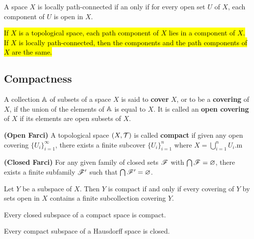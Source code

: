 \vs

\begin{thm}
A space $X$ is locally path-connected if an only if for every open set $U$ of $X$, each component of $U$ is open in $X$.
\end{thm}

\vs

\begin{thm}
\hl{If $X$ is a topological space, each path component of $X$ lies in a component of $X$. If $X$ is locally path-connected, then the components and the path components of $X$ are the same.}
\end{thm}


\subsection{Compactness}\nl
\setcounter{section}{26}
\setcounter{thm}{0}

\dfn A collection $\mathbb{A}$ of subsets of a space $X$ is said to \textbf{cover} $X$, or to be a \textbf{covering} of $X$, if the union of the elements of $\mathbb{A}$ is equal to $X$. It is called an \textbf{open covering} of $X$ if its elements are open subsets of $X$.

\dfn \textbf{(Open Farci)} A topological space $(X, \mathcal{T})$ is called \textbf{compact} if given any open covering $\{U_i\}_{i = 1}^\infty$, there exists a finite subcover $\{U_i\}_{i = 1}^n$ where $X = \bigcup_{i = 1}^n U_i$.m

\dfn \textbf{(Closed Farci)} For any given family of closed sets $\mathscr{F}$ with $\bigcap \mathscr{F} = \varnothing$, there exists a finite subfamily $\mathscr{F}^\prime$ such that $\bigcap\mathscr{F}^\prime = \varnothing$.

\vs

\begin{lem}
Let $Y$ be a subspace of $X$. Then $Y$ is compact if and only if every covering of $Y$ by sets open in $X$ contains a finite subcollection covering $Y$.
\end{lem}

\vs

\begin{thm}
Every closed subspace of a compact space is compact.
\end{thm}

\vs

\begin{thm}
Every compact subspace of a Hausdorff space is closed.
\end{thm}

